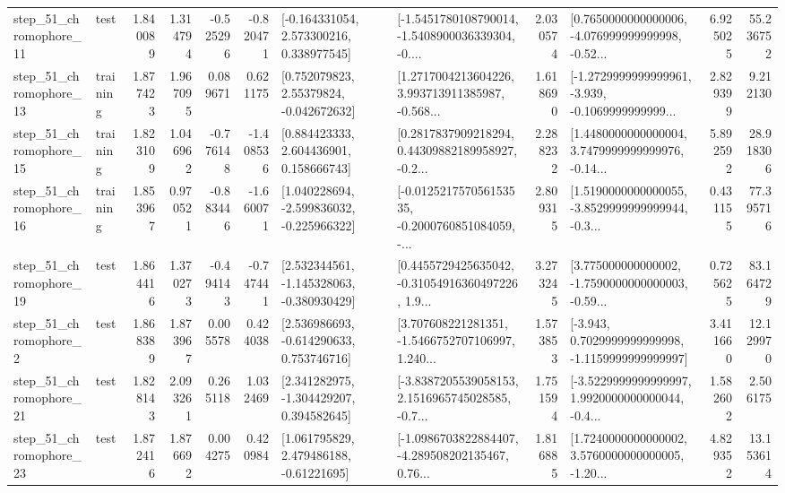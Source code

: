 \begin{tabular}{llrrrrllrlrr}
   step\_51\_chromophore\_11 &      test &      1.840089 &    1.314794 &     -0.525296 & -0.820471 &    [-0.164331054, 2.573300216, 0.338977545] &  [-1.5451780108790014, -1.5408900036339304, -0.... &       2.030574 &  [0.7650000000000006, -4.076999999999998, -0.52... &            6.925025 &         55.236752 \\
   step\_51\_chromophore\_13 &  training &      1.877423 &    1.967095 &      0.089671 &  0.621175 &     [0.752079823, 2.55379824, -0.042672632] &  [1.2717004213604226, 3.993713911385987, -0.568... &       1.618690 &  [-1.2729999999999961, -3.939, -0.1069999999999... &            2.829399 &          9.212130 \\
   step\_51\_chromophore\_15 &  training &      1.823109 &    1.046962 &     -0.776148 & -1.408536 &     [0.884423333, 2.604436901, 0.158666743] &  [0.2817837909218294, 0.44309882189958927, -0.2... &       2.288232 &  [1.4480000000000004, 3.7479999999999976, -0.14... &            5.892592 &         28.918306 \\
   step\_51\_chromophore\_16 &  training &      1.853967 &    0.970521 &     -0.883446 & -1.660071 &   [1.040228694, -2.599836032, -0.225966322] &  [-0.012521757056153535, -0.2000760851084059, -... &       2.809315 &  [1.5190000000000055, -3.8529999999999944, -0.3... &            0.431155 &         77.395716 \\
   step\_51\_chromophore\_19 &      test &      1.864416 &    1.370273 &     -0.494143 & -0.747441 &   [2.532344561, -1.145328063, -0.380930429] &  [0.4455729425635042, -0.31054916360497226, 1.9... &       3.273245 &  [3.775000000000002, -1.7590000000000003, -0.59... &            0.725625 &         83.164729 \\
    step\_51\_chromophore\_2 &      test &      1.868389 &    1.873967 &      0.005578 &  0.424038 &    [2.536986693, -0.614290633, 0.753746716] &  [3.707608221281351, -1.5466752707106997, 1.240... &       1.573853 &  [-3.943, 0.7029999999999998, -1.1159999999999997] &            3.411660 &         12.129970 \\
   step\_51\_chromophore\_21 &      test &      1.828143 &    2.093261 &      0.265118 &  1.032469 &    [2.341282975, -1.304429207, 0.394582645] &  [-3.8387205539058153, 2.1516965745028585, -0.7... &       1.751594 &  [-3.5229999999999997, 1.9920000000000044, -0.4... &            1.582602 &          2.506175 \\
   step\_51\_chromophore\_23 &      test &      1.872416 &    1.876692 &      0.004275 &  0.420984 &     [1.061795829, 2.479486188, -0.61221695] &  [-1.0986703822884407, -4.289508202135467, 0.76... &       1.816885 &  [1.7240000000000002, 3.5760000000000005, -1.20... &            4.829352 &         13.153614 \\

\end{tabular}
